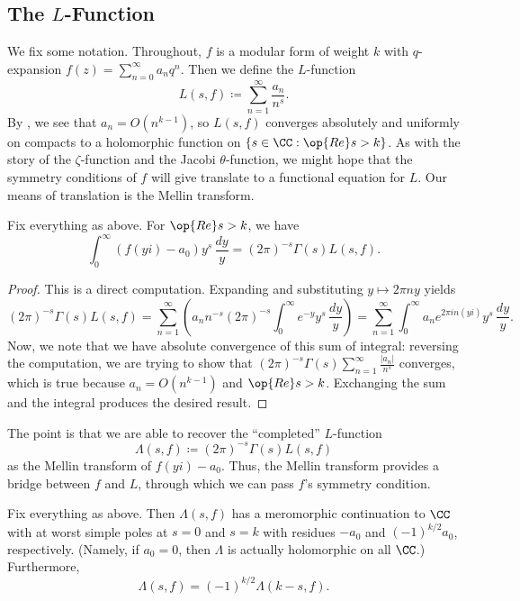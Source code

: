 \documentclass{amsart}
\begin{document}
\subsection{The \texorpdfstring{$L$}{ L}-Function}
We fix some notation. Throughout, $f$ is a modular form of weight $k$ with $q$-expansion $f(z)=\sum_{n=0}^\infty a_nq^n$. Then we define the $L$-function
\begin{equation}
	L(s,f)\coloneqq\sum_{n=1}^\infty\frac{a_n}{n^s}. \label{eq:define-l}
\end{equation}
By , we see that $a_n=O\left(n^{k-1}\right)$, so $L(s,f)$ converges absolutely and uniformly on compacts to a holomorphic function on $\{s\in\CC:\op{Re}s>k\}$. As with the story of the $\zeta$-function and the Jacobi $\theta$-function, we might hope that the symmetry conditions of $f$ will give translate to a functional equation for $L$. Our means of translation is the Mellin transform.
\begin{lemma} \label{lem:computed-completed-l-func}
	Fix everything as above. For $\op{Re}s>k$, we have
	\[\int_0^\infty(f(yi)-a_0)y^s\,\frac{dy}y=(2\pi)^{-s}\Gamma(s)L(s,f).\]
\end{lemma}
\begin{proof}
	This is a direct computation. Expanding and substituting $y\mapsto 2\pi ny$ yields
	\[(2\pi)^{-s}\Gamma(s)L(s,f) = \sum_{n=1}^\infty\left(a_nn^{-s}(2\pi)^{-s}\int_0^\infty e^{-y}y^s\,\frac{dy}y\right)=\sum_{n=1}^\infty\int_0^\infty a_ne^{2\pi in(yi)}y^s\,\frac{dy}y.\]
	Now, we note that we have absolute convergence of this sum of integral: reversing the computation, we are trying to show that $(2\pi)^{-s}\Gamma(s)\sum_{n=1}^\infty\frac{|a_n|}{n^s}$ converges, which is true because $a_n=O\left(n^{k-1}\right)$ and $\op{Re}s>k$. Exchanging the sum and the integral produces the desired result.
\end{proof}
The point is that we are able to recover the ``completed'' $L$-function
\begin{equation}
	\Lambda(s,f)\coloneqq(2\pi)^{-s}\Gamma(s)L(s,f) \label{eq:define-lambda}
\end{equation}
as the Mellin transform of $f(yi)-a_0$. Thus, the Mellin transform provides a bridge between $f$ and $L$, through which we can pass $f$'s symmetry condition.
\begin{proposition} \label{prop:fe}
	Fix everything as above. Then $\Lambda(s,f)$ has a meromorphic continuation to $\CC$ with at worst simple poles at $s=0$ and $s=k$ with residues $-a_0$ and $(-1)^{k/2}a_0$, respectively. (Namely, if $a_0=0$, then $\Lambda$ is actually holomorphic on all $\CC$.) Furthermore,
	\[\Lambda(s,f)=(-1)^{k/2}\Lambda(k-s,f).\]
\end{proposition}
\end{document}
